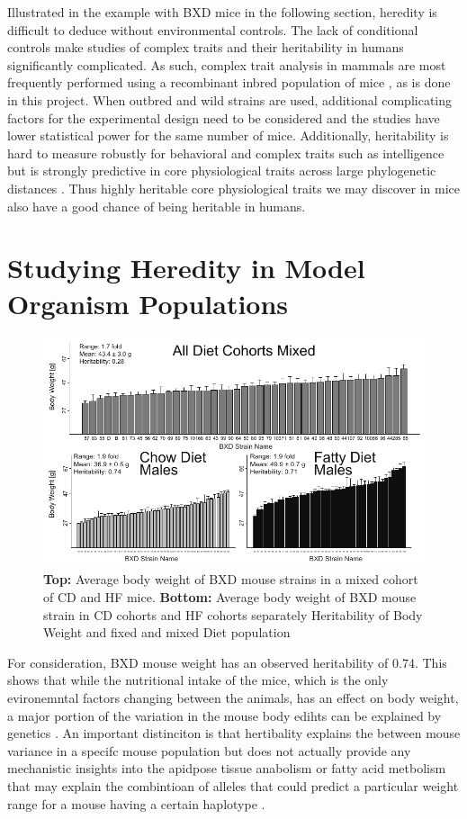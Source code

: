 \documentclass[a4paper,11pt,twoside]{book}
\begin{document}
    Illustrated in the example with BXD mice in the following section, heredity is difficult to deduce without environmental controls. The lack of conditional controls make studies of complex traits and their heritability in humans significantly complicated. As such, complex trait analysis in mammals are most frequently performed using a recombinant inbred population of mice \citep{Williams2015TheAnalysis}, as is done in this project. When outbred and wild strains are used, additional complicating factors for the experimental design need to be considered and the studies have lower statistical power for the same number of mice. Additionally, heritability is hard to measure robustly for behavioral and complex traits such as intelligence but is strongly predictive in core physiological traits across large phylogenetic distances \citep{Falconer1996IntroductionGenetics}. Thus highly heritable core physiological traits we may discover in mice also have a good chance of being heritable in humans.
	
	\section{Studying Heredity in Model Organism Populations}
	\begin{figure}[!htbp]
		\includegraphics[width=\textwidth]{1.Introduction_Figures/BodyWeights.pdf}
		\caption{ \textbf{Top:} Average body weight of BXD mouse strains in a mixed cohort of CD and HF mice. \textbf{Bottom:} Average body weight of BXD mouse strain in CD cohorts and HF cohorts separately
			Heritability of Body Weight and fixed and mixed Diet population}
		\label{fig:Heritablity in Diet and Mixed Populations}
	\end{figure}
	
	For consideration, BXD mouse weight has an observed heritability of 0.74. This shows that while the nutritional intake of the mice, which is the only evironemntal factors changing between the animals, has an effect on body weight, a major portion of  the variation in the mouse body edihts can be explained by genetics \citep{GerhardAdam2012}. An important distinciton is that hertibality explains the between mouse variance in a specifc mouse population but does not actually provide any mechanistic insights into the apidpose tissue anabolism or fatty acid metbolism that may explain the combintioan of alleles that could predict a particular weight range for a mouse having a certain haplotype \citep{GerhardAdam2012}.
	
\end{document}
